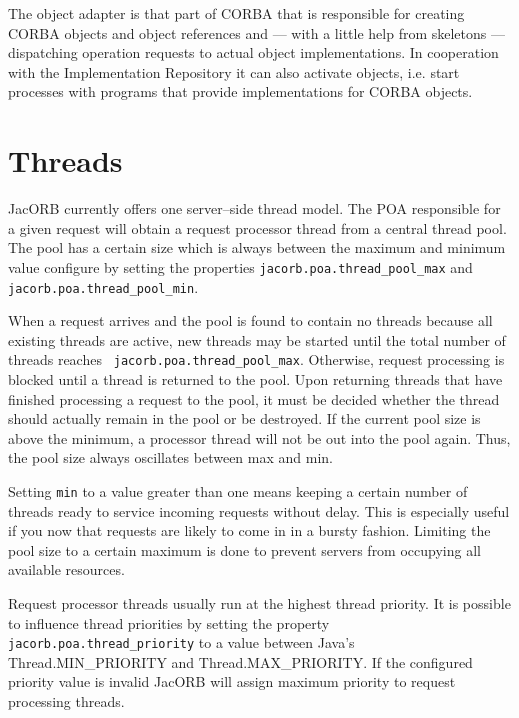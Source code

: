 \documentclass[12pt]{scrbook}
\begin{document}
The  object adapter  is that  part of  CORBA that  is  responsible for
creating CORBA  objects and  object references and  --- with  a little
help  from  skeletons ---  dispatching  operation  requests to  actual
object  implementations.   In  cooperation  with   the  Implementation
Repository  it can also  activate objects,  i.e. start  processes with
programs that provide implementations for CORBA objects.

\section{Threads}

JacORB  currently  offers  one   server--side  thread  model.  The  POA
responsible for a given request will obtain a request processor thread
from  a central  thread pool.  The pool  has a  certain size  which is
always between the maximum and  minimum value configure by setting the
properties     {\tt     jacorb.poa.thread\_pool\_max}     and     {\tt
jacorb.poa.thread\_pool\_min}.

When a  request arrives and  the pool is  found to contain  no threads
because all  existing threads are  active, new threads may  be started
until     the    total    number     of    threads     reaches    {\tt
jacorb.poa.thread\_pool\_max}. Otherwise,  request processing is blocked
until a  thread is returned to  the pool. Upon  returning threads that
have  finished processing a  request to  the pool,  it must  be decided
whether  the  thread  should  actually   remain  in  the  pool  or  be
destroyed. If the current pool  size is above the minimum, a processor
thread will not be out into the pool again. Thus, the pool size always
oscillates between max and min.

Setting {\tt min} to a value  greater than one means keeping a certain
number  of   threads  ready  to  service   incoming  requests  without
delay. This is  especially useful if you now  that requests are likely
to come  in in a bursty fashion.  Limiting the pool size  to a certain
maximum  is  done to  prevent  servers  from  occupying all  available
resources.

Request  processor   threads  usually   run  at  the   highest  thread
priority. It is possible to influence thread priorities by setting the
property  {\tt jacorb.poa.thread\_priority} to  a value  between Java's
Thread.MIN\_PRIORITY and Thread.MAX\_PRIORITY. If the configured priority
value  is  invalid JacORB  will  assign  maximum  priority to  request
processing threads.
\end{document}

